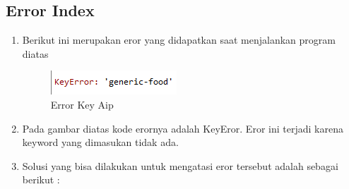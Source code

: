 \subsection{Error Index}
\begin{enumerate}
	\item
Berikut ini merupakan eror yang didapatkan saat menjalankan program diatas
\begin{figure}[ht]
\centering
\includegraphics[scale=0.5]{figures/AIP/errorc1.PNG}
\caption{Error Key Aip }
\label{Error}
\end{figure}
\item
Pada gambar diatas kode erornya adalah KeyEror. Eror ini terjadi karena keyword yang dimasukan tidak ada.
\item
Solusi yang bisa dilakukan untuk mengatasi eror tersebut adalah sebagai berikut : 
\end{enumerate}
